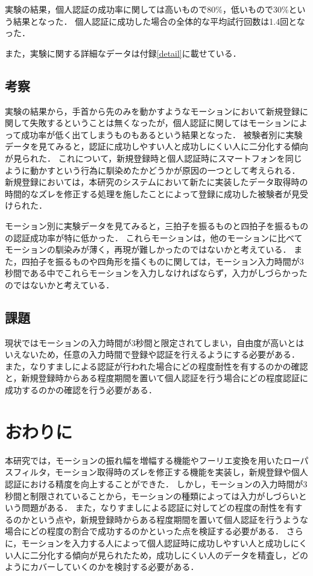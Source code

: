 \documentclass[11pt]{jreport}
\begin{document}
    実験の結果，個人認証の成功率に関しては高いもので80\%，低いもので30\%という結果となった．
    個人認証に成功した場合の全体的な平均試行回数は1.4回となった．

    また，実験に関する詳細なデータは付録\ref{detail}に載せている．

    \section{考察} %
    実験の結果から，手首から先のみを動かすようなモーションにおいて新規登録に関して失敗するということは無くなったが，個人認証に関してはモーションによって成功率が低く出てしまうものもあるという結果となった．
    被験者別に実験データを見てみると，認証に成功しやすい人と成功しにくい人に二分化する傾向が見られた．
    これについて，新規登録時と個人認証時にスマートフォンを同じように動かすという行為に馴染めたかどうかが原因の一つとして考えられる．
    新規登録においては，本研究のシステムにおいて新たに実装したデータ取得時の時間的なズレを修正する処理を施したことによって登録に成功した被験者が見受けられた．

    モーション別に実験データを見てみると，三拍子を振るものと四拍子を振るものの認証成功率が特に低かった．
    これらモーションは，他のモーションに比べてモーションの馴染みが薄く，再現が難しかったのではないかと考えている．
    また，四拍子を振るものや四角形を描くものに関しては，モーション入力時間が3秒間である中でこれらモーションを入力しなければならず，入力がしづらかったのではないかと考えている．

    \section{課題} %
    現状ではモーションの入力時間が3秒間と限定されてしまい，自由度が高いとはいえないため，任意の入力時間で登録や認証を行えるようにする必要がある．
    また，なりすましによる認証が行われた場合にどの程度耐性を有するのかの確認と，新規登録時からある程度期間を置いて個人認証を行う場合にどの程度認証に成功するのかの確認を行う必要がある．

\chapter{おわりに} %
本研究では，モーションの振れ幅を増幅する機能やフーリエ変換を用いたローパスフィルタ，モーション取得時のズレを修正する機能を実装し，新規登録や個人認証における精度を向上することができた．
しかし，モーションの入力時間が3秒間と制限されていることから，モーションの種類によっては入力がしづらいという問題がある．
また，なりすましによる認証に対してどの程度の耐性を有するのかという点や，新規登録時からある程度期間を置いて個人認証を行うような場合にどの程度の割合で成功するのかといった点を検証する必要がある．
さらに，モーションを入力する人によって個人認証時に成功しやすい人と成功しにくい人に二分化する傾向が見られたため，成功しにくい人のデータを精査し，どのようにカバーしていくのかを検討する必要がある．
\end{document}
